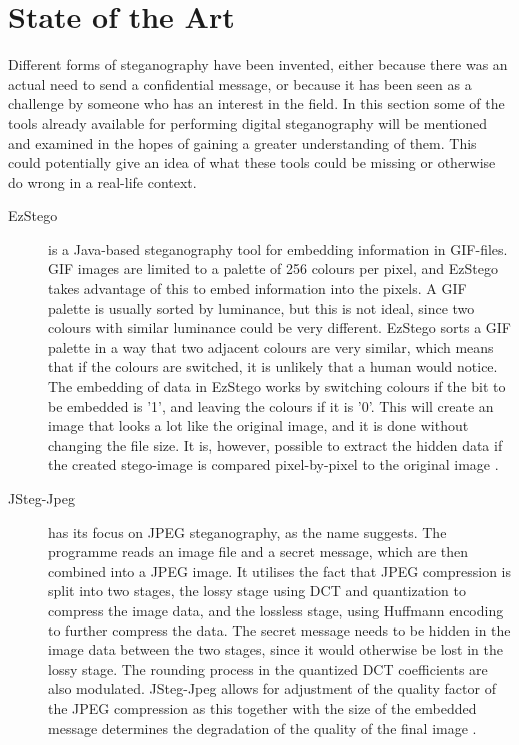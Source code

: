 \section{State of the Art}
\label{sec:SOTA}
Different forms of steganography have been invented, either because there was an actual need to send a confidential message, or because it has been seen as a challenge by someone who has an interest in the field.
In this section some of the tools already available for performing digital steganography will be mentioned and examined in the hopes of gaining a greater understanding of them.
This could potentially give an idea of what these tools could be missing or otherwise do wrong in a real-life context.

\begin{description}
	\item[EzStego] is a Java-based steganography tool for embedding information in GIF-files.
	GIF images are limited to a palette of 256 colours per pixel, and EzStego takes advantage of this to embed information into the pixels.
	A GIF palette is usually sorted by luminance, but this is not ideal, since two colours with similar luminance could be very different.
	EzStego sorts a GIF palette in a way that two adjacent colours are very similar, which means that if the colours are switched, it is unlikely that a human would notice.
	The embedding of data in EzStego works by switching colours if the bit to be embedded is '1', and leaving the colours if it is '0'.
	This will create an image that looks a lot like the original image, and it is done without changing the file size.
	It is, however, possible to extract the hidden data if the created stego-image is compared pixel-by-pixel to the original image \citep{Westfeld2000}.

	\item[JSteg-Jpeg] has its focus on JPEG steganography, as the name suggests.
	The programme reads an image file and a secret message, which are then combined into a JPEG image.
	It utilises the fact that JPEG compression is split into two stages, the lossy stage using DCT and quantization to compress the image data, and the			lossless stage, using Huffmann encoding to further compress the data.
	The secret message needs to be hidden in the image data between the two stages, since it would otherwise be lost in the lossy stage.
	The rounding process in the quantized DCT coefficients are also modulated.
	JSteg-Jpeg allows for adjustment of the quality factor of the JPEG compression as this together with the size of the embedded message determines the 		degradation of the quality of the final image \citep{ImageProcessingFrankY}.
	

\end{description}
